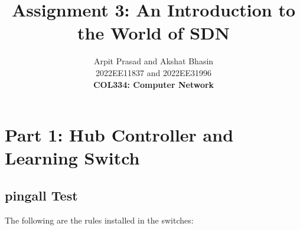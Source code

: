 \documentclass[12pt]{article}
\begin{document}
 
 
\title{\textbf{Assignment 3: An Introduction to the World of SDN}}
\author{Arpit Prasad and Akshat Bhasin\\ 2022EE11837 and 2022EE31996 \\
\textbf{COL334: Computer Network}}

\maketitle
\section{Part 1: Hub Controller and Learning Switch}

\subsection{pingall Test}

The following are the rules installed in the switches:
\end{document}
